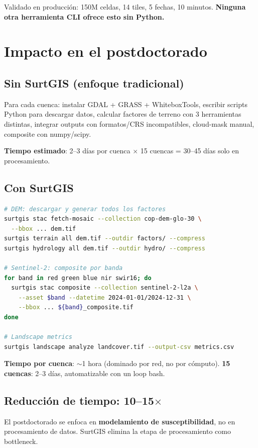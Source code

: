 \documentclass[11pt,a4paper]{article}
\begin{document}
Validado en producci\'on: 150M celdas, 14 tiles, 5 fechas, 10 minutos. \textbf{Ninguna otra herramienta CLI ofrece esto sin Python.}

\section{Impacto en el postdoctorado}

\subsection{Sin SurtGIS (enfoque tradicional)}

Para cada cuenca: instalar GDAL + GRASS + WhiteboxTools, escribir scripts Python para descargar datos, calcular factores de terreno con 3 herramientas distintas, integrar outputs con formatos/CRS incompatibles, cloud-mask manual, composite con numpy/scipy.

\textbf{Tiempo estimado}: 2--3 d\'ias por cuenca $\times$ 15 cuencas = 30--45 d\'ias solo en procesamiento.

\subsection{Con SurtGIS}

\begin{lstlisting}[language=bash]
# DEM: descargar y generar todos los factores
surtgis stac fetch-mosaic --collection cop-dem-glo-30 \
  --bbox ... dem.tif
surtgis terrain all dem.tif --outdir factors/ --compress
surtgis hydrology all dem.tif --outdir hydro/ --compress

# Sentinel-2: composite por banda
for band in red green blue nir swir16; do
  surtgis stac composite --collection sentinel-2-l2a \
    --asset $band --datetime 2024-01-01/2024-12-31 \
    --bbox ... ${band}_composite.tif
done

# Landscape metrics
surtgis landscape analyze landcover.tif --output-csv metrics.csv
\end{lstlisting}

\textbf{Tiempo por cuenca}: $\sim$1 hora (dominado por red, no por c\'omputo). \textbf{15 cuencas}: 2--3 d\'ias, automatizable con un loop bash.

\subsection{Reducci\'on de tiempo: 10--15$\times$}

El postdoctorado se enfoca en \textbf{modelamiento de susceptibilidad}, no en procesamiento de datos. SurtGIS elimina la etapa de procesamiento como bottleneck.
\end{document}

